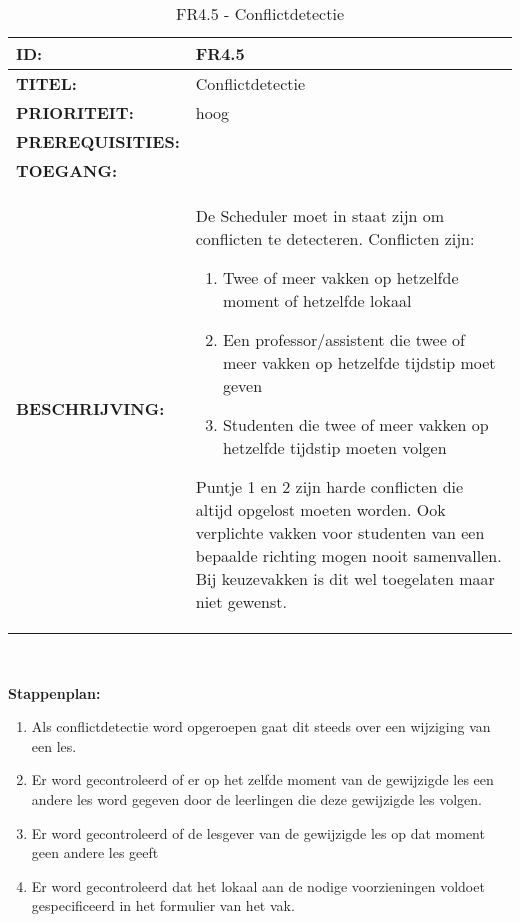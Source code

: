         
\noindent\begin{table}[H]
            \begin{tabular}{l | p{10cm}}
                \textbf{ID:} & FR4.5 \\ \hline
                \textbf{TITEL:} & Conflictdetectie\\ \hline
                \textbf{PRIORITEIT:} & hoog \\ \hline
                \textbf{PREREQUISITIES:} & \\ \hline
                \textbf{TOEGANG:} &  \\ \hline
                \textbf{BESCHRIJVING:} & De Scheduler moet in staat zijn om conflicten te detecteren. Conflicten zijn: 
                \begin{enumerate}
                \item Twee of meer vakken op hetzelfde moment of hetzelfde lokaal
                \item Een professor/assistent  die twee of meer vakken op hetzelfde tijdstip moet geven 
                \item Studenten die twee of meer vakken op hetzelfde tijdstip moeten volgen
                \end{enumerate}
                Puntje 1 en 2 zijn harde conflicten die altijd opgelost moeten worden. Ook verplichte vakken voor studenten van een bepaalde richting mogen nooit samenvallen. Bij keuzevakken is dit wel toegelaten maar niet gewenst.\\
            \end{tabular}\\
            \caption{FR4.5 - Conflictdetectie}
            \label{tab:FR4.5 - Conflictdetectie}
        \end{table}
        
\textbf{Stappenplan:}
	\begin{enumerate}
	\item Als conflictdetectie word opgeroepen gaat dit steeds over een wijziging van een les.
	\item Er word gecontroleerd of er op het zelfde moment van de gewijzigde les een andere les word gegeven door de leerlingen die deze gewijzigde les volgen.
	\item Er word gecontroleerd of de lesgever van de gewijzigde les op dat moment geen andere les geeft
	\item Er word gecontroleerd dat het lokaal aan de nodige voorzieningen voldoet gespecificeerd in het formulier van het vak. 
	\end{enumerate}

\clearpage